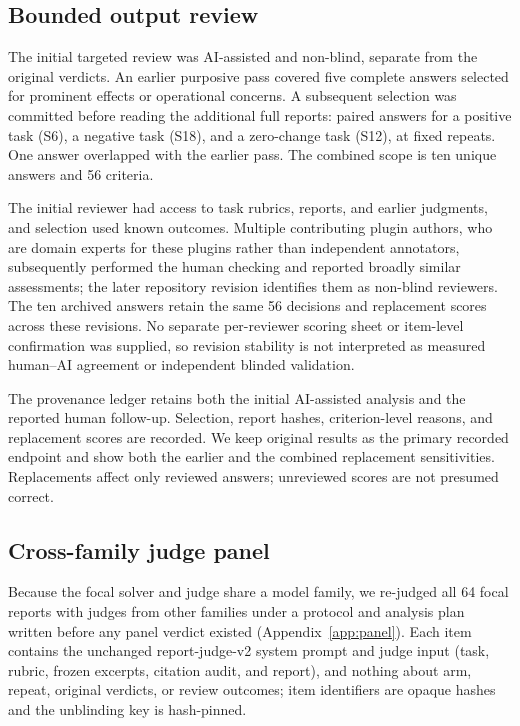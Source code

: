 \documentclass[11pt]{article}
\begin{document}
\subsection{Bounded output review}\label{sec:bounded_review}
The initial targeted review was AI-assisted and non-blind, separate from the original verdicts. An earlier purposive pass covered five complete answers selected for prominent effects or operational concerns. A subsequent selection was committed before reading the additional full reports: paired answers for a positive task (S6), a negative task (S18), and a zero-change task (S12), at fixed repeats. One answer overlapped with the earlier pass. The combined scope is ten unique answers and 56 criteria.

The initial reviewer had access to task rubrics, reports, and earlier judgments, and selection used known outcomes. Multiple contributing plugin authors, who are domain experts for these plugins rather than independent annotators, subsequently performed the human checking and reported broadly similar assessments; the later repository revision identifies them as non-blind reviewers. The ten archived answers retain the same 56 decisions and replacement scores across these revisions. No separate per-reviewer scoring sheet or item-level confirmation was supplied, so revision stability is not interpreted as measured human--AI agreement or independent blinded validation.

The provenance ledger retains both the initial AI-assisted analysis and the reported human follow-up. Selection, report hashes, criterion-level reasons, and replacement scores are recorded. We keep original results as the primary recorded endpoint and show both the earlier and the combined replacement sensitivities. Replacements affect only reviewed answers; unreviewed scores are not presumed correct.

\subsection{Cross-family judge panel}\label{sec:panel}
Because the focal solver and judge share a model family, we re-judged all 64 focal reports with judges from other families under a protocol and analysis plan written before any panel verdict existed (Appendix~\ref{app:panel}). Each item contains the unchanged report-judge-v2 system prompt and judge input (task, rubric, frozen excerpts, citation audit, and report), and nothing about arm, repeat, original verdicts, or review outcomes; item identifiers are opaque hashes and the unblinding key is hash-pinned.
\end{document}
